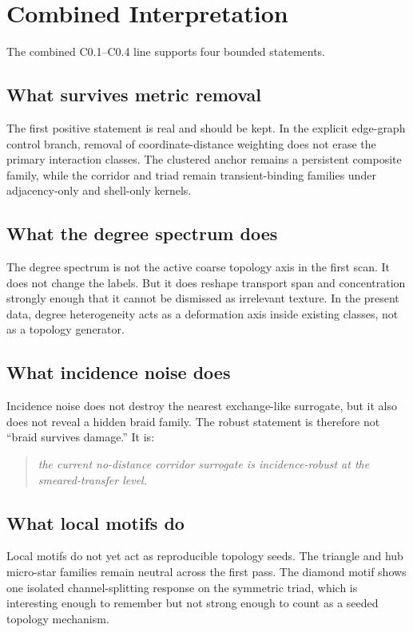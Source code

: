 \documentclass[11pt]{article}
\begin{document}
\section{Combined Interpretation}

The combined C0.1--C0.4 line supports four bounded statements.

\subsection{What survives metric removal}

The first positive statement is real and should be kept. In the explicit edge-graph control branch, removal of coordinate-distance weighting does not erase the primary interaction classes. The clustered anchor remains a persistent composite family, while the corridor and triad remain transient-binding families under adjacency-only and shell-only kernels.

\subsection{What the degree spectrum does}

The degree spectrum is not the active coarse topology axis in the first scan. It does not change the labels. But it does reshape transport span and concentration strongly enough that it cannot be dismissed as irrelevant texture. In the present data, degree heterogeneity acts as a deformation axis inside existing classes, not as a topology generator.

\subsection{What incidence noise does}

Incidence noise does not destroy the nearest exchange-like surrogate, but it also does not reveal a hidden braid family. The robust statement is therefore not ``braid survives damage.'' It is:
\begin{quote}
\emph{the current no-distance corridor surrogate is incidence-robust at the smeared-transfer level.}
\end{quote}

\subsection{What local motifs do}

Local motifs do not yet act as reproducible topology seeds. The triangle and hub micro-star families remain neutral across the first pass. The diamond motif shows one isolated channel-splitting response on the symmetric triad, which is interesting enough to remember but not strong enough to count as a seeded topology mechanism.
\end{document}
